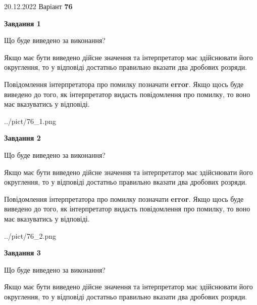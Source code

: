 \documentclass[12pt, ukrainian]{article}
\begin{document}
{20.12.2022 Варіант \No \textbf { 76 }\par}
{
\begin {Large}

{\begin {center}\textbf{Завдання 1}\end {center}}\par
Що буде виведено за виконання? \par

Якщо має бути виведено дійсне значення та інтерпретатор має здійснювати його округлення, 
то у відповіді достатньо правильно вказати два дробових розряди.

Повідомлення інтерпретатора про помилку позначати \textbf{error}.
Якщо щось буде виведено до того, як інтерпретатор видасть повідомлення про помилку, 
то воно має вказуватись у відповіді. \par

\begin{center}
	{../pict/76_1.png}
\end{center}
\newpage

{\begin {center}\textbf{Завдання 2}\end {center}}\par
Що буде виведено за виконання? \par

Якщо має бути виведено дійсне значення та інтерпретатор має здійснювати його округлення, 
то у відповіді достатньо правильно вказати два дробових розряди.

Повідомлення інтерпретатора про помилку позначати \textbf{error}.
Якщо щось буде виведено до того, як інтерпретатор видасть повідомлення про помилку, 
то воно має вказуватись у відповіді. \par

\begin{center}
	{../pict/76_2.png}
\end{center}
\newpage

{\begin {center}\textbf{Завдання 3}\end {center}}\par
Що буде виведено за виконання? \par

Якщо має бути виведено дійсне значення та інтерпретатор має здійснювати його округлення, 
то у відповіді достатньо правильно вказати два дробових розряди.


\end{Large}}
\end{document}
